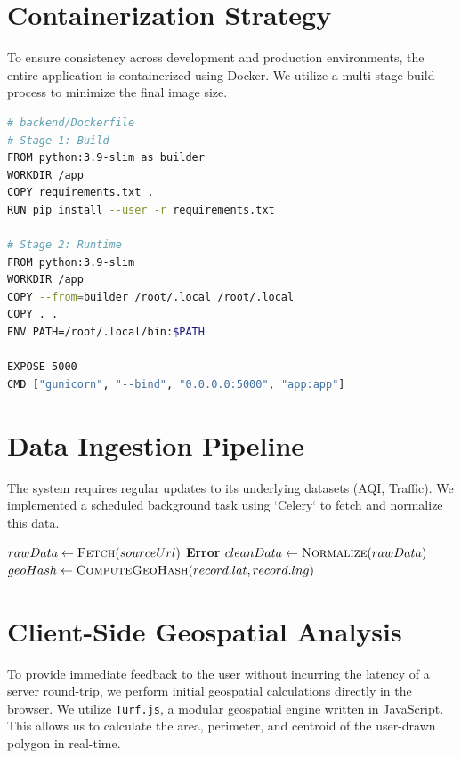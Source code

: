 \documentclass[12pt,a4paper]{report}
\begin{document}
\section{Containerization Strategy}
To ensure consistency across development and production environments, the entire application is containerized using Docker. We utilize a multi-stage build process to minimize the final image size.

\begin{lstlisting}[language=bash, caption=Backend Dockerfile]
# backend/Dockerfile
# Stage 1: Build
FROM python:3.9-slim as builder
WORKDIR /app
COPY requirements.txt .
RUN pip install --user -r requirements.txt

# Stage 2: Runtime
FROM python:3.9-slim
WORKDIR /app
COPY --from=builder /root/.local /root/.local
COPY . .
ENV PATH=/root/.local/bin:$PATH

EXPOSE 5000
CMD ["gunicorn", "--bind", "0.0.0.0:5000", "app:app"]
\end{lstlisting}

\section{Data Ingestion Pipeline}
The system requires regular updates to its underlying datasets (AQI, Traffic). We implemented a scheduled background task using `Celery` to fetch and normalize this data.

\begin{algorithm}
\caption{Data Ingestion Workflow}
\begin{algorithmic}[1]
    \State $rawData \gets \Call{Fetch}{sourceUrl}$
        \State \Return \textbf{Error}
    \EndIf
    \State $cleanData \gets \Call{Normalize}{rawData}$
        \State $geoHash \gets \Call{ComputeGeoHash}{record.lat, record.lng}$
        \State {}
    \EndFor
    \State {}
\EndProcedure
\end{algorithmic}
\end{algorithm}

\section{Client-Side Geospatial Analysis}
To provide immediate feedback to the user without incurring the latency of a server round-trip, we perform initial geospatial calculations directly in the browser. We utilize \texttt{Turf.js}, a modular geospatial engine written in JavaScript. This allows us to calculate the area, perimeter, and centroid of the user-drawn polygon in real-time.
\end{document}
